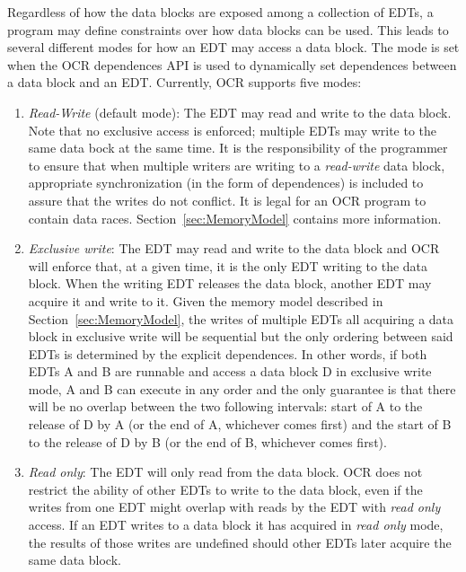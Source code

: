 Regardless of how the data blocks are exposed among a collection of
EDTs, a program may define constraints over how data
blocks can be used. This leads to several different modes for how an
EDT may access a data block. The mode is set when the OCR dependences
API is used to dynamically set dependences between a data block and an
EDT. Currently, OCR supports five modes:
\begin{enumerate}
\item \emph{Read-Write} (default mode): The EDT may read
  and write to the data block. Note that no exclusive
  access is enforced; multiple EDTs may write to the same data bock at the same
  time. It is the responsibility of the programmer to
  ensure that when multiple writers are writing to a \emph{read-write} data block,
  appropriate synchronization (in the form of dependences)
  is included to assure that the writes do not conflict. It is
  legal for an OCR program to contain data
  races. Section~\ref{sec:MemoryModel} contains more information.

\item \emph{Exclusive write}: The
  EDT may read and write to the data block and OCR will enforce
  that, at a given time, it is the only EDT writing to the data
  block. When the writing EDT releases the data block, another EDT may
  acquire it and write to it. Given the memory model described in
  Section~\ref{sec:MemoryModel}, the writes of multiple EDTs all
  acquiring a data block in exclusive write will be sequential but the only
  ordering between said EDTs is determined by the explicit dependences. In
  other words, if both EDTs A and B are runnable and access a
  data block D in exclusive write mode, A and B can execute in any order and
  the only guarantee is that there will be no overlap between the two
  following intervals: start of A to the release of D by A (or the end of A, whichever
  comes first) and the start of B to the release of D by B (or the end of B,
  whichever comes first).

\item \emph{Read only}: The EDT
  will only read from the data block. OCR does
  not restrict the ability of other EDTs to write to the data block,
  even if the writes from one EDT might overlap with reads by the EDT
  with \emph{read only} access. If an EDT writes to a data block
  it has acquired in \emph{read only} mode, the results of those writes are
  undefined should other EDTs later acquire the same data block.


\end{enumerate}
